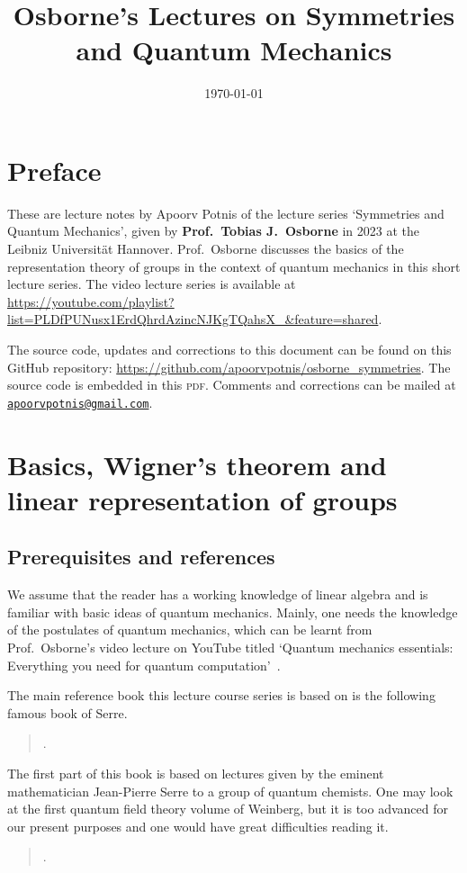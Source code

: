 \documentclass[a4 paper, 12pt]{book}
\title{\textsf{\textbf{Osborne's Lectures on Symmetries and Quantum Mechanics}}}
\author{}
\date{\textsf{\today}}
\theoremstyle{definition}
\begin{document}
	\hypertarget{TitlePage}{}
	\maketitle

	\chapter*{Preface}
	\hypertarget{Preface}{}
	These are lecture notes by Apoorv Potnis of the lecture series `Symmetries and Quantum Mechanics', given by \textbf{Prof.\ Tobias J.\ Osborne} in 2023 at the Leibniz Universität Hannover. Prof.\ Osborne discusses the basics of the representation theory of groups in the context of quantum mechanics in this short lecture series. The video lecture series is available at \url{https://youtube.com/playlist?list=PLDfPUNusx1ErdQhrdAzincNJKgTQahsX_&feature=shared}.

	The source code, updates and corrections to this document can be found on this GitHub repository: \url{https://github.com/apoorvpotnis/osborne_symmetries}. The source code is embedded in this \textsc{pdf}. Comments and corrections can be mailed at \href{mailto:apoorvpotnis@gmail.com}{\texttt{apoorvpotnis@gmail.com}}.
	\clearpage

	\hypertarget{Contents}{}
	\tableofcontents

	\chapter{Basics, Wigner's theorem and linear representation of groups}

	\section{Prerequisites and references}

	We assume that the reader has a working knowledge of linear algebra and is familiar with basic ideas of quantum mechanics. Mainly, one needs the knowledge of the postulates of quantum mechanics, which can be learnt from Prof.\ Osborne's video lecture on YouTube titled `Quantum mechanics essentials: Everything you need for quantum computation'~\cite{Osborne_quantum_essentials}.

	The main reference book this lecture course series is based on is the following famous book of Serre.\begin{quote}.\end{quote}The first part of this book is based on lectures given by the eminent mathematician Jean-Pierre Serre to a group of quantum chemists. One may look at the first quantum field theory volume of Weinberg, but it is too advanced for our present purposes and one would have great difficulties reading it.\begin{quote}.\end{quote}
\end{document}
